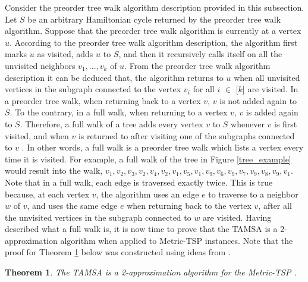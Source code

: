 \documentclass[12pt]{article}
\newtheorem{theorem}[definition]{Theorem}
\numberwithin{equation}{subsection}
\numberwithin{table}{subsection}
\numberwithin{algorithm}{subsection}
\numberwithin{figure}{subsection}
\begin{document}
Consider the preorder tree walk algorithm description provided in this subsection. Let $S$ be an arbitrary Hamiltonian cycle returned by the preorder tree walk algorithm. Suppose that the preorder tree walk algorithm is currently at a vertex $u$. According to the preorder tree walk algorithm description, the algorithm first marks $u$ as visited, adds $u$ to $S$, and then it recursively calls itself on all the unvisited neighbors $v_1, ..., v_k$ of $u$. From the preorder tree walk algorithm description it can be deduced that, the algorithm returns to $u$ when all unvisited vertices in the subgraph connected to the vertex $v_i$ for all $i$ $\in$ [$k$] are visited. In a preorder tree walk, when returning back to a vertex $v$, $v$ is not added again to $S$. To the contrary, in a full walk, when returning to a vertex $v$, $v$ is added again to $S$. Therefore, a full walk of a tree adds every vertex $v$ to $S$ whenever $v$ is first visited, and when $v$ is returned to after visiting one of the subgraphs connected to $v$ \cite{cormen_leiserson_rivest_stein}. In other words, a full walk is a preorder tree walk which lists a vertex every time it is visited. For example, a full walk of the tree in Figure \ref{tree_example} would result into the walk, $v_1, v_2, v_3, v_2, v_4, v_2, v_1, v_5, v_1, v_9, v_6, v_9, v_7, v_9, v_8, v_9, v_1$. Note that in a full walk, each edge is traversed exactly twice. This is true because, at each vertex $v$, the algorithm uses an edge $e$ to traverse to a neighbor $w$ of $v$, and uses the same edge $e$ when returning back to the vertex $v$, after all the unvisited vertices in the subgraph connected to $w$ are visited. Having described what a full walk is, it is now time to prove that the TAMSA is a 2-approximation algorithm when applied to Metric-TSP instances. Note that the proof for Theorem \ref{2_approx} below was constructed using ideas from \cite{cormen_leiserson_rivest_stein}.
\begin{theorem}
\label{2_approx}
The TAMSA is a 2-approximation algorithm for the Metric-TSP {}.
\end{theorem}
\end{document}
